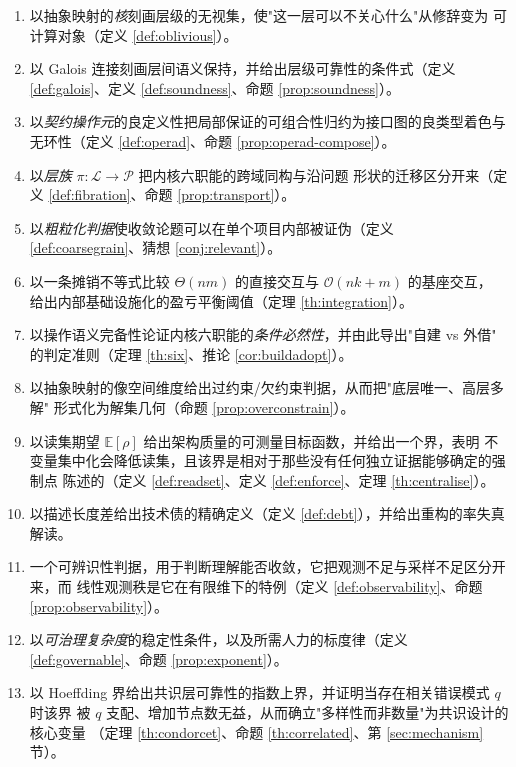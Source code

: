 \begin{enumerate}[label=(C\arabic*)]
\item 以抽象映射的\emph{核}刻画层级的无视集，使"这一层可以不关心什么"从修辞变为
      可计算对象（定义 \ref{def:oblivious}）。
\item 以 Galois 连接刻画层间语义保持，并给出层级可靠性的条件式（定义
      \ref{def:galois}、定义 \ref{def:soundness}、命题 \ref{prop:soundness}）。
\item 以\emph{契约操作元}的良定义性把局部保证的可组合性归约为接口图的良类型着色与
      无环性（定义 \ref{def:operad}、命题 \ref{prop:operad-compose}）。
\item 以\emph{层族} $\pi:\mathcal{L}\to\mathcal{P}$ 把内核六职能的跨域同构与沿问题
      形状的迁移区分开来（定义 \ref{def:fibration}、命题 \ref{prop:transport}）。
\item 以\emph{粗粒化判据}使收敛论题可以在单个项目内部被证伪（定义
      \ref{def:coarsegrain}、猜想 \ref{conj:relevant}）。
\item 以一条摊销不等式比较 $\Theta(nm)$ 的直接交互与 $\mathcal{O}(nk+m)$ 的基座交互，
      给出内部基础设施化的盈亏平衡阈值（定理 \ref{th:integration}）。
\item 以操作语义完备性论证内核六职能的\emph{条件必然性}，并由此导出"自建 vs 外借"
      的判定准则（定理 \ref{th:six}、推论 \ref{cor:buildadopt}）。
\item 以抽象映射的像空间维度给出过约束/欠约束判据，从而把"底层唯一、高层多解"
      形式化为解集几何（命题 \ref{prop:overconstrain}）。
\item 以读集期望 $\mathbb{E}[\rho]$ 给出架构质量的可测量目标函数，并给出一个界，表明
      不变量集中化会降低读集，且该界是相对于那些没有任何独立证据能够确定的强制点
      陈述的（定义 \ref{def:readset}、定义 \ref{def:enforce}、定理
      \ref{th:centralise}）。
\item 以描述长度差给出技术债的精确定义（定义 \ref{def:debt}），并给出重构的率失真
      解读。
\item 一个可辨识性判据，用于判断理解能否收敛，它把观测不足与采样不足区分开来，而
      线性观测秩是它在有限维下的特例（定义 \ref{def:observability}、命题
      \ref{prop:observability}）。
\item 以\emph{可治理复杂度}的稳定性条件，以及所需人力的标度律（定义
      \ref{def:governable}、命题 \ref{prop:exponent}）。
\item 以 Hoeffding 界给出共识层可靠性的指数上界，并证明当存在相关错误模式 $q$ 时该界
      被 $q$ 支配、增加节点数无益，从而确立"多样性而非数量"为共识设计的核心变量
      （定理 \ref{th:condorcet}、命题 \ref{th:correlated}、第 \ref{sec:mechanism} 节）。

\end{enumerate}
